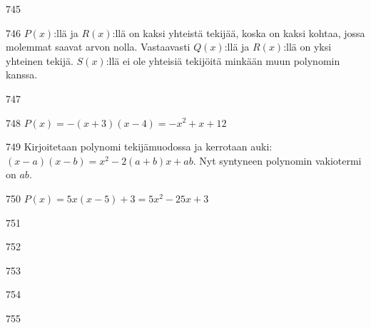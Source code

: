 \begin{Vastaus}{745}
\end{Vastaus}
\begin{Vastaus}{746}
	$P(x)$:llä ja $R(x)$:llä on kaksi yhteistä tekijää, koska on kaksi kohtaa, jossa molemmat saavat arvon nolla. Vastaavasti $Q(x)$:llä ja $R(x)$:llä on yksi yhteinen tekijä. $S(x)$:llä ei ole yhteisiä tekijöitä minkään muun polynomin kanssa.
    
\end{Vastaus}
\begin{Vastaus}{747}
    
\end{Vastaus}
\begin{Vastaus}{748}
        $P(x)=-(x+3)(x-4)=-x^2+x+12$
    
\end{Vastaus}
\begin{Vastaus}{749}
        Kirjoitetaan polynomi tekijämuodossa ja kerrotaan auki: $(x-a)(x-b)=x^2-2(a+b)x+ab$. Nyt syntyneen polynomin vakiotermi on $ab$.
    
\end{Vastaus}
\begin{Vastaus}{750}
        $P(x)=5x(x-5)+3=5x^2-25x+3$
    
\end{Vastaus}
\begin{Vastaus}{751}
        \alakohdat{
            § $x=\frac14$ ja $y=5\frac58$.
            § $x=-\frac{b}{2a}$ %
        }
    
\end{Vastaus}
\begin{Vastaus}{752}
    
\end{Vastaus}
\begin{Vastaus}{753}
	
\end{Vastaus}
\begin{Vastaus}{754}
\end{Vastaus}
\begin{Vastaus}{755}
    
\end{Vastaus}
